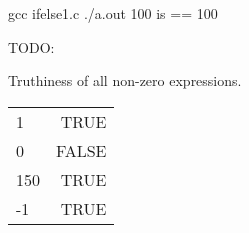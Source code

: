 \begin{Terminal}
gcc ifelse1.c
./a.out
100 is == 100
\end{Terminal}


TODO:

Truthiness of all non-zero expressions.

\begin{tabular}{l | r}
1 & TRUE \\
0 & FALSE \\
150 & TRUE \\
-1 & TRUE
\end{tabular}
